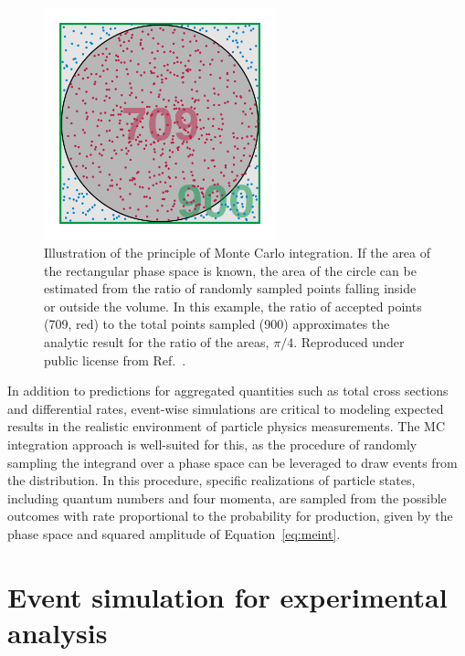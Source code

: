 \begin{figure}[htbp]
  \centering
   \includegraphics[width=0.6\textwidth]{figures/Simulation/MCintegration.png}
  \caption[Illustration of the principle of Monte Carlo integration.]{
    Illustration of the principle of Monte Carlo integration. If the area
    of the rectangular phase space is known, the area of the circle can
    be estimated from the ratio of randomly sampled points falling
    inside or outside the volume. In this example, the ratio of accepted
    points (709, red) to the total points sampled (900) approximates the
    analytic result for the ratio of the areas, $\pi/4$.
    Reproduced under public license from Ref.~\cite{wiki:mc}.
        }
 \label{fig:mcintegration}
\end{figure}

In addition to predictions for aggregated quantities such as total cross sections
and differential rates, event-wise simulations are critical to modeling expected 
results in the realistic environment of particle physics measurements.
The MC integration approach is well-suited for this, as the procedure of randomly
sampling the integrand over a phase space can be leveraged to draw events from
the distribution. In this procedure, specific realizations of particle states,
including quantum numbers and four momenta, are sampled from
the possible outcomes with rate proportional to the probability for production,
given by the phase space and squared amplitude of Equation~\ref{eq:meint}.

\section{Event simulation for experimental analysis}

